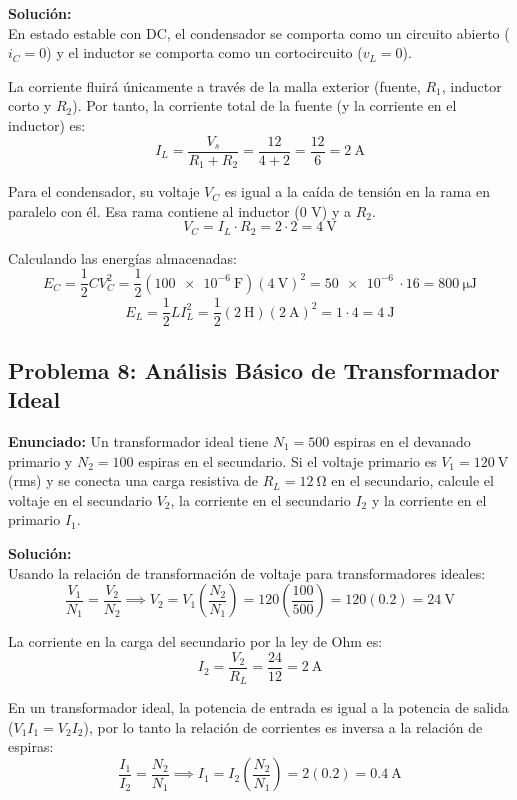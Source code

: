 \documentclass[12pt, a4paper]{article}
\begin{document}
\textbf{Solución:}\\
En estado estable con DC, el condensador se comporta como un circuito abierto ($i_C = 0$) y el inductor se comporta como un cortocircuito ($v_L = 0$).

La corriente fluirá únicamente a través de la malla exterior (fuente, $R_1$, inductor corto y $R_2$). Por tanto, la corriente total de la fuente (y la corriente en el inductor) es:
\[ I_L = \frac{V_s}{R_1 + R_2} = \frac{12}{4 + 2} = \frac{12}{6} = \SI{2}{\ampere} \]

Para el condensador, su voltaje $V_C$ es igual a la caída de tensión en la rama en paralelo con él. Esa rama contiene al inductor (0 V) y a $R_2$.
\[ V_C = I_L \cdot R_2 = 2 \cdot 2 = \SI{4}{\volt} \]

Calculando las energías almacenadas:
\[ E_C = \frac{1}{2} C V_C^2 = \frac{1}{2} (\SI{100e-6}{\farad}) (\SI{4}{\volt})^2 = \SI{50e-6}{} \cdot 16 = \SI{800}{\micro\joule} \]
\[ E_L = \frac{1}{2} L I_L^2 = \frac{1}{2} (\SI{2}{\henry}) (\SI{2}{\ampere})^2 = 1 \cdot 4 = \SI{4}{\joule} \]

\subsection*{Problema 8: Análisis Básico de Transformador Ideal}
\textbf{Enunciado:} Un transformador ideal tiene $N_1 = 500$ espiras en el devanado primario y $N_2 = 100$ espiras en el secundario. Si el voltaje primario es $V_1 = \SI{120}{\volt}$ (rms) y se conecta una carga resistiva de $R_L = \SI{12}{\ohm}$ en el secundario, calcule el voltaje en el secundario $V_2$, la corriente en el secundario $I_2$ y la corriente en el primario $I_1$.

\textbf{Solución:}\\
Usando la relación de transformación de voltaje para transformadores ideales:
\[ \frac{V_1}{N_1} = \frac{V_2}{N_2} \implies V_2 = V_1 \left( \frac{N_2}{N_1} \right) = 120 \left( \frac{100}{500} \right) = 120 (0.2) = \SI{24}{\volt} \]

La corriente en la carga del secundario por la ley de Ohm es:
\[ I_2 = \frac{V_2}{R_L} = \frac{24}{12} = \SI{2}{\ampere} \]

En un transformador ideal, la potencia de entrada es igual a la potencia de salida ($V_1 I_1 = V_2 I_2$), por lo tanto la relación de corrientes es inversa a la relación de espiras:
\[ \frac{I_1}{I_2} = \frac{N_2}{N_1} \implies I_1 = I_2 \left( \frac{N_2}{N_1} \right) = 2 (0.2) = \SI{0.4}{\ampere} \]
\end{document}
